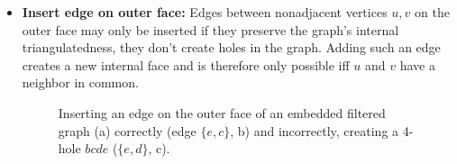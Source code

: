 \begin{itemize}
	\clearpage
	\item \textbf{Insert edge on outer face:} Edges between nonadjacent vertices $u, v$ on the outer face may only be inserted if they preserve the graph's internal triangulatedness, \ie{} they don't create holes in the graph. Adding such an edge creates a new internal face and is therefore only possible iff $u$ and $v$ have a neighbor in common.
\begin{figure}[H]
	\centering
	\quad
	\quad
	\caption{Inserting an edge on the outer face of an embedded filtered graph (a) correctly (edge $\{e,c\}$, b) and incorrectly, creating a 4-hole $bcde$ ($\{e,d\}$, c).}
	\label{fig:transformation}
\end{figure}


\end{itemize}
